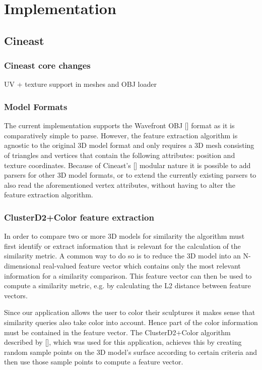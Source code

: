 \chapter{Implementation}

\section{Cineast}

\subsection{Cineast core changes}
UV + texture support in meshes and OBJ loader

\subsection{Model Formats}

The current implementation supports the Wavefront OBJ [] format as it is comparatively
simple to parse. However, the feature extraction algorithm is agnostic to the original 3D model format and only requires
a 3D mesh consisting of triangles and vertices that contain the following attributes: position and texture coordinates.
Because of Cineast's [] modular nature it is possible to add parsers for other 3D model formats, or
to extend the currently existing parsers to also read the aforementioned vertex attributes, without having to alter
the feature extraction algorithm.

\subsection{ClusterD2+Color feature extraction}


In order to compare two or more 3D models for similarity the algorithm must first identify or
extract information that is relevant for the calculation of the similarity metric.
A common way to do so is to reduce the 3D model into an N-dimensional real-valued feature vector which
contains only the most relevant information for a similarity comparison. This feature vector can
then be used to compute a similarity metric, e.g. by calculating the L2 distance between feature vectors.

Since our application allows the user to color their sculptures it makes sense that similarity queries also
take color into account. Hence part of the color information must be contained in the feature vector.
The ClusterD2+Color algorithm described by [], which was used for this application,
achieves this by creating random sample points on the 3D model's surface according to certain criteria and then
use those sample points to compute a feature vector.

